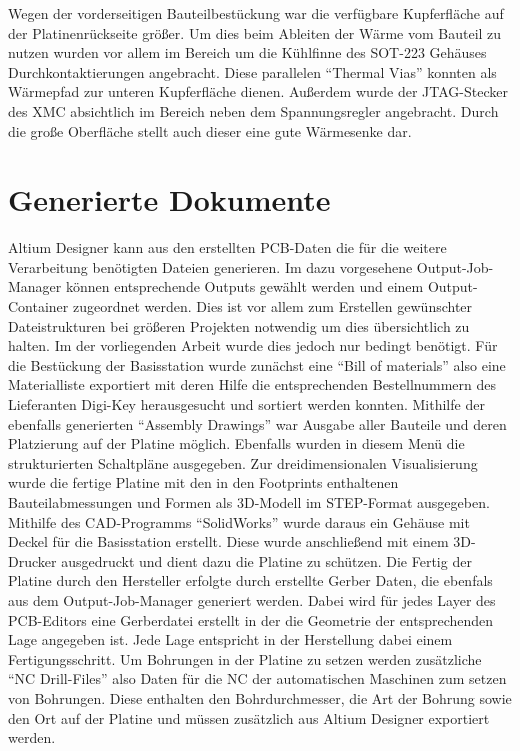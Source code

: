 Wegen der vorderseitigen Bauteilbestückung war die verfügbare Kupferfläche auf der Platinenrückseite  größer. Um dies beim Ableiten der Wärme vom Bauteil zu nutzen wurden vor allem im Bereich um die Kühlfinne des \ac{SOT}-223 Gehäuses Durchkontaktierungen angebracht. Diese parallelen \enquote{Thermal Vias} konnten als Wärmepfad zur unteren Kupferfläche dienen. Außerdem wurde der \ac{JTAG}-Stecker des XMC absichtlich im Bereich neben dem Spannungsregler angebracht. Durch die große Oberfläche stellt auch dieser eine gute Wärmesenke dar. %

\section{Generierte Dokumente}
Altium Designer kann aus den erstellten \ac{PCB}-Daten die für die weitere Verarbeitung benötigten Dateien generieren. Im dazu vorgesehene Output-Job-Manager können entsprechende Outputs gewählt werden und einem Output-Container zugeordnet werden. Dies ist vor allem zum Erstellen gewünschter Dateistrukturen bei größeren Projekten notwendig um dies übersichtlich zu halten. Im der vorliegenden Arbeit wurde dies jedoch nur bedingt benötigt.
Für die Bestückung der Basisstation wurde zunächst eine \enquote{Bill of materials} also eine Materialliste exportiert mit deren Hilfe die entsprechenden Bestellnummern des Lieferanten Digi-Key herausgesucht und sortiert werden konnten. Mithilfe der ebenfalls generierten \enquote{Assembly Drawings} war Ausgabe aller Bauteile und deren Platzierung auf der Platine möglich. Ebenfalls wurden in diesem Menü die strukturierten Schaltpläne ausgegeben.
Zur dreidimensionalen Visualisierung wurde die fertige Platine mit den in den Footprints enthaltenen Bauteilabmessungen und Formen als 3D-Modell im \ac{STEP}-Format ausgegeben. Mithilfe des \ac{CAD}-Programms \enquote{SolidWorks} wurde daraus ein Gehäuse mit Deckel für die Basisstation erstellt. Diese wurde anschließend mit einem 3D-Drucker ausgedruckt und dient dazu die Platine zu schützen.
Die Fertig der Platine durch den Hersteller erfolgte durch erstellte Gerber Daten, die ebenfals aus dem Output-Job-Manager generiert werden. Dabei wird für jedes Layer des \ac{PCB}-Editors eine Gerberdatei erstellt in der die Geometrie der entsprechenden Lage angegeben ist. Jede Lage entspricht in der Herstellung dabei einem Fertigungsschritt. Um Bohrungen in der Platine zu setzen werden zusätzliche \enquote{NC Drill-Files} also Daten für die \ac{NC} der automatischen Maschinen zum setzen von Bohrungen. Diese enthalten den Bohrdurchmesser, die Art der Bohrung sowie den Ort auf der Platine und müssen zusätzlich aus Altium Designer exportiert werden.


